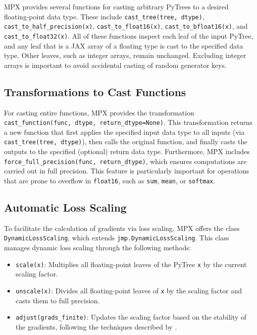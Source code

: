 \documentclass[10pt, a4paper, logo, onecolumn, internal, copyright]{dsme}
\newcommand{\mpx}{\textsc{MPX}}
\begin{document}
\mpx{} provides several functions for casting arbitrary PyTrees to a desired floating-point data type. These include
\texttt{cast\_tree(tree, dtype)}, \texttt{cast\_to\_half\_precision(x)}, \texttt{cast\_to\_float16(x)}, \texttt{cast\_to\_bfloat16(x)}, and \texttt{cast\_to\_float32(x)}. All of these functions inspect each leaf of the input PyTree, and any leaf that is a JAX array of a floating type is cast to the specified data type. Other leaves, such as integer arrays, remain unchanged.
Excluding integer arrays is important to avoid accidental casting of random generator keys.

\subsection{Transformations to Cast Functions}
\label{sec:castingfunctions}

For casting entire functions, \mpx{} provides the transformation \texttt{cast\_function(func, dtype, return\_dtype=None)}. 
This transformation returns a new function that first applies the specified input data type to all inputs (via \texttt{cast\_tree(tree, dtype)}), then calls the original function, and finally casts the outputs to the specified (optional) return data type. 
Furthermore, \mpx{} includes \texttt{force\_full\_precision(func, return\_dtype)}, which ensures computations are carried out in full precision. 
This feature is particularly important for operations that are prone to overflow in \texttt{float16}, such as \texttt{sum}, \texttt{mean}, or \texttt{softmax}.


\subsection{Automatic Loss Scaling}
\label{sec:scaling}

To facilitate the calculation of gradients via loss scaling, \mpx{} offers the class \texttt{DynamicLossScaling}, which extends \texttt{jmp.DynamicLossScaling}. This class manages dynamic loss scaling through the following methods:

\begin{itemize}
    \item \texttt{scale(x)}: Multiplies all floating-point leaves of the PyTree \texttt{x} by the current scaling factor.
    \item \texttt{unscale(x)}: Divides all floating-point leaves of \texttt{x} by the scaling factor and casts them to full precision.
    \item \texttt{adjust(grads\_finite)}: Updates the scaling factor based on the stability of the gradients, following the techniques described by \cite{nvidia_amp}.
\end{itemize}
\end{document}
